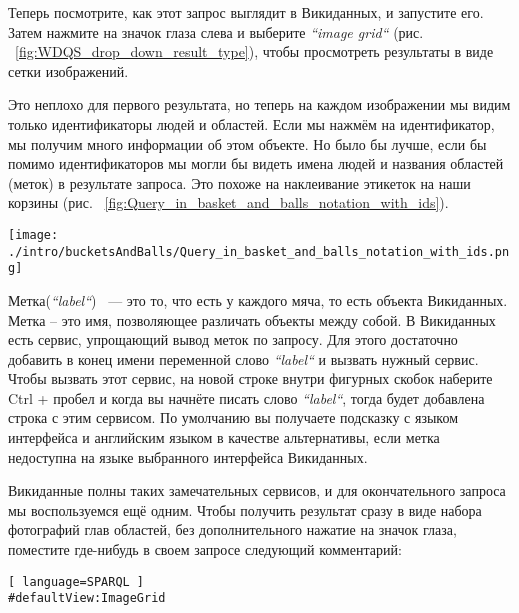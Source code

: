\newpage Теперь посмотрите, как этот запрос выглядит в Викиданных, и запустите его. Затем нажмите на значок глаза слева и выберите \textit{``image grid``} (рис. ~\ref{fig:WDQS_drop_down_result_type}), чтобы просмотреть результаты в виде сетки изображений.

\begin{marginfigure}
	{
		\setlength{\fboxsep}{0pt}%
		\setlength{\fboxrule}{1pt}%
	}
    \caption{Выбор отображения результатов в виде \textit{``image grid``} (сетки изображений).}
	\label{fig:WDQS_drop_down_result_type}
\end{marginfigure}

Это неплохо для первого результата, но теперь на каждом изображении мы видим только идентификаторы людей и областей. Если мы нажмём на идентификатор, мы получим много информации об этом объекте. Но было бы лучше, если бы помимо идентификаторов мы могли бы видеть имена людей и названия областей (меток) в результате запроса. Это похоже на наклеивание этикеток на наши корзины (рис. ~\ref{fig:Query_in_basket_and_balls_notation_with_ids}).

\begin{figure*}[h!]
\texttt{[image: ./intro/bucketsAndBalls/Query\_in\_basket\_and\_balls\_notation\_with\_ids.png]}
\caption{Запрос в нотации <<Корзины и мячи с номерами свойств и объектов Викиданных>>.}
\label{fig:Query_in_basket_and_balls_notation_with_ids}
\end{figure*}

Метка(\textit{``label``}) ~--- это то, что есть у каждого мяча, то есть объекта Викиданных. Метка – это имя, позволяющее различать объекты между собой. В Викиданных есть сервис, упрощающий вывод меток по запросу. Для этого достаточно добавить в конец имени переменной слово \textit{``label``} и вызвать нужный сервис. Чтобы вызвать этот сервис, на новой строке внутри фигурных скобок наберите Ctrl + пробел и когда вы начнёте писать слово \textit{``label``}, тогда будет добавлена строка с этим сервисом. По умолчанию вы получаете подсказку с языком интерфейса и английским языком в качестве альтернативы, если метка недоступна на языке выбранного интерфейса Викиданных.

Викиданные полны таких замечательных сервисов, и для окончательного запроса мы воспользуемся ещё одним. Чтобы получить результат сразу в виде набора фотографий глав областей, без дополнительного нажатие на значок глаза, поместите где-нибудь в своем запросе следующий комментарий:
\begin{lstlisting}[ language=SPARQL ]
#defaultView:ImageGrid
\end{lstlisting}

